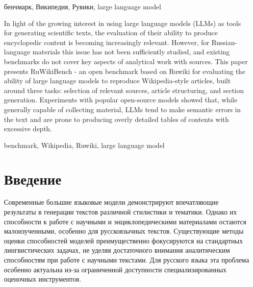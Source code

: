\documentclass{article}
\begin{document}
\begin{keywords}
бенчмарк, Википедия, Рувики, large language model
\end{keywords}

\begin{altabstract}
In light of the growing interest in using large language models (LLMs) as tools for generating scientific texts,
the evaluation of their ability to produce encyclopedic content is becoming increasingly relevant.
However, for Russian-language materials this issue has not been sufficiently studied, and existing benchmarks do not cover key aspects of analytical work with sources.
This paper presents RuWikiBench - an open benchmark based on Ruwiki for evaluating the ability of large language models to reproduce Wikipedia-style articles,
built around three tasks:
selection of relevant sources, article structuring, and section generation.
Experiments with popular open-source models showed that, while generally capable of collecting material, LLMs tend to make semantic errors in the text
and are prone to producing overly detailed tables of contents with excessive depth.
\end{altabstract}

\begin{altkeywords}
benchmark, Wikipedia, Ruwiki, large language model
\end{altkeywords}

\section*{Введение}

Современные большие языковые модели демонстрируют впечатляющие результаты в генерации текстов различной стилистики и тематики. 
Однако их способности к работе с научными и энциклопедическими материалами остаются малоизученными, особенно для русскоязычных текстов.
Существующие методы оценки способностей моделей преимущественно фокусируются на стандартных лингвистических задачах, не уделяя достаточного внимания аналитическим способностям при работе с научными текстами.
Для русского языка эта проблема особенно актуальна из-за ограниченной доступности специализированных оценочных инструментов.
\end{document}
